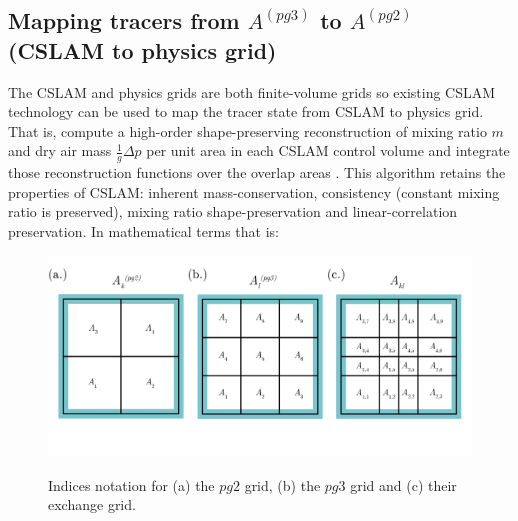 \subsection{Mapping tracers from $A^{(pg3)}$ to $A^{(pg2)}$ (CSLAM to physics grid)}\label{sec:nctopg}
The CSLAM and physics grids are both finite-volume grids so existing CSLAM technology can be used to map the tracer state from CSLAM to physics grid. That is, compute a high-order shape-preserving reconstruction of mixing ratio $m$ and dry air mass  $\frac{1}{g}\Delta p$ per unit area in each CSLAM control volume and integrate those reconstruction functions over the overlap areas \citep{LNU2010JCP,NL2010JCP}. This algorithm retains the properties of CSLAM: inherent mass-conservation, consistency (constant mixing ratio is preserved), mixing ratio shape-preservation and linear-correlation preservation. In mathematical terms that is:

\begin{figure}[t]
\begin{center}
\noindent\includegraphics[width=30pc,angle=0]{figs/area-schematic.png}\\
\end{center}
\caption{Indices notation for (a) the $pg2$ grid, (b) the $pg3$ grid and (c) their exchange grid.}
\label{fig:area-schematic}
\end{figure}

